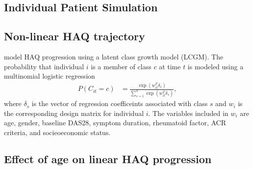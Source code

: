 \documentclass[11pt,final,fleqn]{article}\usepackage[]{graphicx}\usepackage[]{color}
\theoremstyle{plain}
\begin{document}
\begin{appendices}

\section{Individual Patient Simulation}\label{appendix:IPS}
\subsection{Non-linear HAQ trajectory}\label{non-linear-haq}
\citet{norton2014health} model HAQ progression using a latent class growth model (LCGM). The probability that individual $i$ is a member of class $c$ at time $t$ is modeled using a multinomial logistic regression
\begin{align}
P(C_{it} = c) &= \frac{\exp(w_{it}^T\delta_c)}{\sum_{s=1}^{4}\exp(w_{it}^T\delta_s)},
\end{align}
where $\delta_s$ is the vector of regression coefficeints associated with class $s$ and $w_i$ is the corresponding design matrix for individual $i$. The variables included in $w_i$ are age, gender, baseline DAS28, symptom duration, rheumatoid factor, ACR criteria, and socieoeconomic status. 

\subsection{Effect of age on linear HAQ
progression}\label{effect-of-age-on-linear-haq-progression}


\end{appendices}
\end{document}

